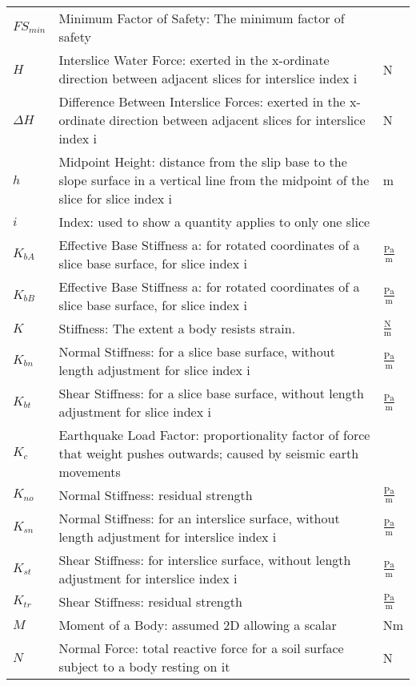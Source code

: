 \documentclass[12pt]{article}
\begin{document}
\begin{longtabu}{l X[l] l}
\\
${FS_{min}}$ & Minimum Factor of Safety: The minimum factor of safety & 
\\
$H$ & Interslice Water Force: exerted in the x-ordinate direction between adjacent slices for interslice index i & N
\\
$ΔH$ & Difference Between Interslice Forces: exerted in the x-ordinate direction between adjacent slices for interslice index i & N
\\
$h$ & Midpoint Height: distance from the slip base to the slope surface in a vertical line from the midpoint of the slice for slice index i & m
\\
$i$ & Index: used to show a quantity applies to only one slice & 
\\
${K_{bA}}$ & Effective Base Stiffness a: for rotated coordinates of a slice base surface, for slice index i & $\frac{\text{Pa}}{\text{m}}$
\\
${K_{bB}}$ & Effective Base Stiffness a: for rotated coordinates of a slice base surface, for slice index i & $\frac{\text{Pa}}{\text{m}}$
\\
$K$ & Stiffness: The extent a body resists strain. & $\frac{\text{N}}{\text{m}}$
\\
${K_{bn}}$ & Normal Stiffness: for a slice base surface, without length adjustment for slice index i & $\frac{\text{Pa}}{\text{m}}$
\\
${K_{bt}}$ & Shear Stiffness: for a slice base surface, without length adjustment for slice index i & $\frac{\text{Pa}}{\text{m}}$
\\
${K_{c}}$ & Earthquake Load Factor: proportionality factor of force that weight pushes outwards; caused by seismic earth movements & 
\\
${K_{no}}$ & Normal Stiffness: residual strength & $\frac{\text{Pa}}{\text{m}}$
\\
${K_{sn}}$ & Normal Stiffness: for an interslice surface, without length adjustment for interslice index i & $\frac{\text{Pa}}{\text{m}}$
\\
${K_{st}}$ & Shear Stiffness: for interslice surface, without length adjustment for interslice index i & $\frac{\text{Pa}}{\text{m}}$
\\
${K_{tr}}$ & Shear Stiffness: residual strength & $\frac{\text{Pa}}{\text{m}}$
\\
$M$ & Moment of a Body: assumed 2D allowing a scalar & Nm
\\
$N$ & Normal Force: total reactive force for a soil surface subject to a body resting on it & N

\end{longtabu}
\end{document}
